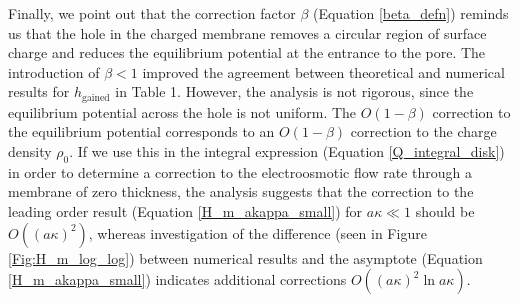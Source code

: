 Finally, we point out that the
correction factor $\beta$ (Equation \ref{beta_defn})
reminds us that the hole in the charged membrane removes a circular
region of surface charge and reduces the equilibrium potential
at the entrance to the pore. The introduction of
$\beta<1$ improved the agreement between
theoretical and numerical results for $h_\text{gained}$ in Table 1.
However, the analysis is not rigorous, since the equilibrium
potential across the hole is not uniform. The $O(1-\beta)$
correction to the equilibrium potential corresponds to an $O(1-\beta)$
correction
to the charge density $\rho_0$.
If we use this in the integral expression
(Equation \ref{Q_integral_disk})
in order to determine a correction to the electroosmotic flow rate
through a membrane of zero thickness, the analysis suggests that the correction
to the leading order result (Equation \ref{H_m_akappa_small})
for $a\kappa\ll 1$ should be $O((a\kappa)^2)$,
whereas investigation of the difference (seen in Figure \ref{Fig:H_m_log_log})
between numerical results and the asymptote (Equation \ref{H_m_akappa_small})
indicates additional
corrections $O((a\kappa)^2\ln a\kappa)$.





